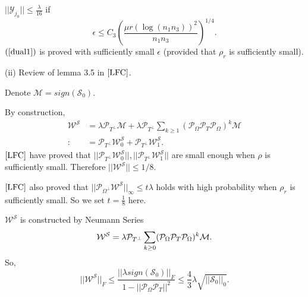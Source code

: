 \documentclass[journal,transmag]{IEEEtran}
\theoremstyle{plain}
\begin{document}
\noindent $||\mathcal{Y}_{j_0}||\le \frac{\lambda}{16}$ if
\begin{equation}
{\epsilon \le C_3 (\frac{\mu r (\log(n_1 n_3))^2}{n_1 n_3})^{1/4}}.
\end{equation}
$(\ref{dual1})$ is proved with sufficiently small $\epsilon$ (provided that $\rho_r$ is sufficiently small).

(ii) Review of lemma 3.5 in $\cite{LFC}$.

Denote $\mathcal{M} = sign(\mathcal{S}_0)$.

By construction,
\begin{equation}
\begin{split}
\mathcal{W}^{\mathcal{S}} &= \lambda \mathcal{P}_{T^{\bot}}\mathcal{M} + \lambda\mathcal{P}_{T^{\bot}}\sum_{k\ge1} (\mathcal{P}_{\Omega}\mathcal{P}_{T}\mathcal{P}_{\Omega})^k \mathcal{M} \\
:&= \mathcal{P}_{T^{\bot}} \mathcal{W}_0^{\mathcal{S}} +\mathcal{P}_{T^{\bot}} \mathcal{W}_1^{\mathcal{S}}.
\end{split}
\end{equation}
$\cite{LFC}$ have proved that $||\mathcal{P}_{T^{\bot}} \mathcal{W}_0^{\mathcal{S}}||, ||\mathcal{P}_{T^{\bot}} \mathcal{W}_1^{\mathcal{S}}||$ are small enough when $\rho$ is sufficiently small. Therefore $||\mathcal{W}^{\mathcal{S}}||\le 1/8$.

$\cite{LFC}$ also proved that $||\mathcal{P}_{\Omega^{\bot}}\mathcal{W}^{\mathcal{S}}||_{\infty}\le t\lambda$ holds with high probability when $\rho_r$ is sufficiently small. So we set $t = \frac{1}{8}$ here.

$\mathcal{W}^{\mathcal{S}}$ is constructed by Neumann Series \[\mathcal{W}^{\mathcal{S}} = \lambda\mathcal{P}_{T^{\bot}}\sum_{k\ge0} (\mathcal{P}_{\Omega}\mathcal{P}_{T}\mathcal{P}_{\Omega})^k \mathcal{M} \\.\] So,
\begin{equation}
{||\mathcal{W}^{\mathcal{S}}||_F \le \frac{||\lambda sign(\mathcal{S}_0)||_F}{1-||\mathcal{P}_{\Omega}\mathcal{P}_T||^2}}\le\frac{4}{3}\lambda \sqrt{||\mathcal{S}_0||_0}.
\end{equation}
\end{document}
